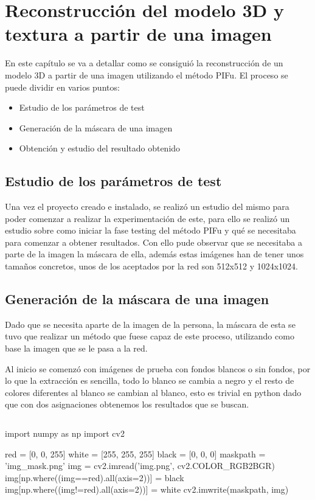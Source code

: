 \chapter{Reconstrucción del modelo 3D y textura a partir de una imagen}
\label{Reconstrucción}
En este capítulo se va a detallar como se consiguió la reconstrucción de un modelo 3D a partir de una imagen utilizando el método PIFu. El proceso se puede dividir en varios puntos:

\begin{itemize}
	\item Estudio de los parámetros de test
	\item Generación de la máscara de una imagen
	\item Obtención y estudio del resultado obtenido
\end{itemize}

\section{Estudio de los parámetros de test}

Una vez el proyecto creado e instalado, se realizó un estudio del mismo para poder comenzar a realizar la experimentación de este, para ello se realizó un estudio sobre como iniciar la fase testing del método PIFu y qué se necesitaba para comenzar a obtener resultados. Con ello pude observar que se necesitaba a parte de la imagen la máscara de ella, además estas imágenes han de tener unos tamaños concretos, unos de los aceptados por la red son 512x512 y 1024x1024.

\section{Generación de la máscara de una imagen}

Dado que se necesita aparte de la imagen de la persona, la máscara de esta se tuvo que realizar un método que fuese capaz de este proceso, utilizando como base la imagen que se le pasa a la red.

Al inicio se comenzó con imágenes de prueba con fondos blancos o sin fondos, por lo que la extracción es sencilla, todo lo blanco se cambia a negro y el resto de colores diferentes al blanco se cambian al blanco, esto es trivial en python dado que con dos asignaciones obtenemos los resultados que se buscan.

\begin{lstlisting}[caption={Código obtención máscara 1}, label=cod:1]
\end{lstlisting}
\begin{python}
	import numpy as np
	import cv2 
	
	red = [0, 0, 255]
	white = [255, 255, 255]
	black = [0, 0, 0]
	maskpath = 'img_mask.png'
	img = cv2.imread('img.png', cv2.COLOR_RGB2BGR)
	img[np.where((img==red).all(axis=2))] = black
	img[np.where((img!=red).all(axis=2))] = white
	cv2.imwrite(maskpath, img)
\end{python}

